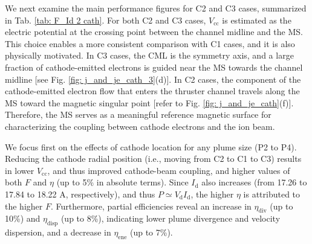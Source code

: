 \documentclass[%
 aip,
cha,
 amsmath,amssymb,
 reprint,%
]{revtex4-1}
\begin{document}
We next examine the main performance figures for C2 and C3 cases, summarized in Tab. \ref{tab: F_Id 2 cath}.
%
For both C2 and C3 cases, $V_\mathrm{cc}$ is estimated as the electric potential at the crossing point between the channel midline and the MS. This choice enables a more consistent comparison with C1 cases, and it is also physically motivated. In C3 cases, the CML is the symmetry axis, and a large fraction of cathode-emitted electrons is guided near the MS towards the channel midline [see Fig. \ref{fig: j_and_je_cath_3}(d)].
%
In C2 cases, the component of the cathode-emitted electron flow that enters the thruster channel travels along the MS toward the magnetic singular point [refer to Fig. \ref{fig: j_and_je_cath}(f)].
%
Therefore, the MS serves as a meaningful reference magnetic surface for characterizing the coupling between cathode electrons and the ion beam.


We focus first on the effects of cathode location for any plume size (P2 to P4). Reducing the cathode radial position (i.e., moving from C2 to C1 to C3) results in lower $V_\mathrm{cc}$, and thus improved cathode-beam coupling, and higher values of both $F$ and $\eta$ (up to 5\% in absolute terms). Since $I_\mathrm{d}$ also increases (from 17.26 to 17.84 to 18.22 A, respectively), and thus $P \simeq V_\mathrm{d}I_\mathrm{d}$, the higher $\eta$ is attributed to the higher $F$.
%
Furthermore, partial efficiencies reveal an increase in $\eta_\mathrm{div}$ (up to 10\%) and $\eta_\mathrm{disp}$ (up to 8\%), indicating lower plume divergence and velocity dispersion, and a decrease in $\eta_\mathrm{ene}$ (up to 7\%).
\end{document}

